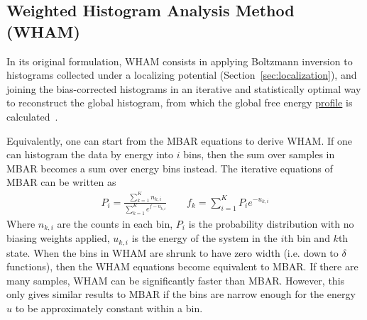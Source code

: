 \documentclass[9pt,review]{livecoms}
\begin{document}

\subsection{Weighted Histogram Analysis Method (WHAM)}

In its original formulation, WHAM consists in applying Boltzmann inversion to histograms collected under a localizing potential (Section~\ref{sec:localization}), and joining the bias-corrected histograms in an iterative and statistically optimal way to reconstruct the global histogram, from which the global free energy \hyperlink{ref:FES} {profile} is calculated~\cite{kumars:WHAM}.

Equivalently, one can start from the MBAR equations to derive WHAM.
If one can histogram the data by energy into $i$ bins, then the sum over samples in MBAR becomes a sum over energy bins instead. The iterative equations of MBAR can be written as
\begin{eqnarray}
P_i = \frac{\sum_{k=1}^K n_{k,i}}{\sum_{k=1}^{K}{e^{f-u_{k,i}}}}\qquad
f_k = \sum_{i=1}^K P_i e^{-{u_{k,i}}}
\end{eqnarray}
Where $n_{k,i}$ are the counts in each bin, $P_i$ is the probability distribution with no biasing weights applied,  $u_{k,i}$ is the energy of the system in the $i$th bin and $k$th state. When the bins in WHAM are shrunk to have zero width (i.e. down to $\delta$ functions), then the WHAM equations become equivalent to MBAR. If there are many samples, WHAM can be significantly faster than MBAR. However,  this only gives similar results to MBAR if the bins are narrow enough for the energy $u$ to be approximately constant within a bin.
\end{document}
